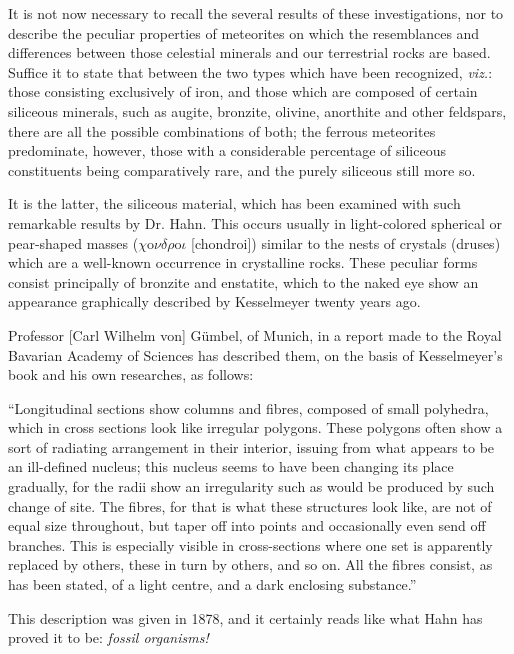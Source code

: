 \documentclass[a4paper, 12pt, oneside]{article}
\begin{document}
It is not now necessary to recall the several results of these investigations, nor to describe the peculiar properties of meteorites on which the resemblances and differences between those celestial minerals and our terrestrial rocks are based. Suffice it to state that between the two types which have been recognized, \emph{viz.}: those consisting exclusively of iron, and those which are composed of certain siliceous minerals, such as augite, bronzite, olivine, anorthite and other feldspars, there are all the possible combinations of both; the ferrous meteorites predominate, however, those with a considerable percentage of siliceous constituents being comparatively rare, and the purely siliceous still more so.

It is the latter, the siliceous material, which has been examined with such remarkable results by Dr. Hahn. This occurs usually in light-colored spherical or pear-shaped masses ($\chi$o$\nu\delta\rho$o$\iota$ [chondroi]) similar to the nests of crystals (druses) which are a well-known occurrence in crystalline rocks. These peculiar forms consist principally of bronzite and enstatite, which to the naked eye show an appearance graphically described by Kesselmeyer twenty years ago.

Professor [Carl Wilhelm von] Gümbel, of Munich, in a report made to the Royal Bavarian Academy of Sciences has described them, on the basis of Kesselmeyer's book and his own researches, as follows:

``Longitudinal sections show columns and fibres, composed of small polyhedra, which in cross sections look like irregular polygons. These polygons often show a sort of radiating arrangement in their interior, issuing from what appears to be an ill-defined nucleus; this nucleus seems to have been changing its place gradually, for the radii show an irregularity such as would be produced by such change of site. The fibres, for that is what these structures look like, are not of equal size throughout, but taper off into points and occasionally even send off branches. This is especially visible in cross-sections where one set is apparently replaced by others, these in turn by others, and so on. All the fibres consist, as has been stated, of a light centre, and a dark enclosing substance.''

This description was given in 1878, and it certainly reads like what Hahn has proved it to be: \emph{fossil organisms!}
\end{document}
